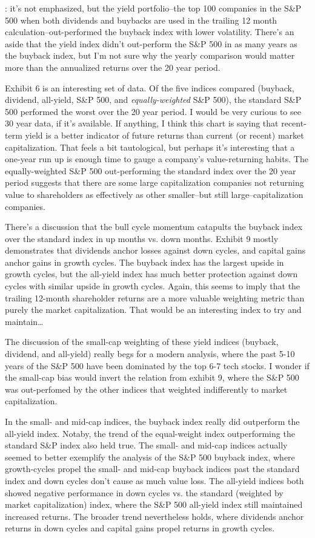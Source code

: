 \documentclass{article}
\begin{document}
: it's not emphasized, but the yield portfolio--the top 100 companies in the S\&P 500 when both dividends and buybacks are used in the trailing 12 month calculation--out-performed the buyback index with lower volatility.  There's an aside that the yield index didn't out-perform the S\&P 500 in as many years as the buyback index, but I'm not sure why the yearly comparison would matter more than the annualized returns over the 20 year period.

Exhibit 6 is an interesting set of data.  Of the five indices compared (buyback, dividend, all-yield, S\&P 500, and {\it equally-weighted} S\&P 500), the standard S\&P 500 performed the worst over the 20 year period.  I would be very curious to see 30 year data, if it's available.  If anything, I think this chart is saying that recent-term yield is a better indicator of future returns than current (or recent) market capitalization.  That feels a bit tautological, but perhaps it's interesting that a one-year run up is enough time to gauge a company's value-returning habits.  The equally-weighted S\&P 500 out-performing the standard index over the 20 year period suggests that there are some large capitalization companies not returning value to shareholders as effectively as other smaller--but still large--capitalization companies.

There's a discussion that the bull cycle momentum catapults the buyback index over the standard index in up months vs. down months.  Exhibit 9 mostly demonstrates that dividends anchor losses against down cycles, and capital gains anchor gains in growth cycles.  The buyback index has the largest upside in growth cycles, but the all-yield index has much better protection against down cycles with similar upside in growth cycles.  Again, this seems to imply that the trailing 12-month shareholder returns are a more valuable weighting metric than purely the market capitalization.  That would be an interesting index to try and maintain\ldots

The discussion of the small-cap weighting of these yield indices (buyback, dividend, and all-yield) really begs for a modern analysis, where the past 5-10 years of the S\&P 500 have been dominated by the top 6-7 tech stocks.  I wonder if the small-cap bias would invert the relation from exhibit 9, where the S\&P 500 was out-perfomed by the other indices that weighted indifferently to market capitalization.

In the small- and mid-cap indices, the buyback index really did outperform the all-yield index.  Notaby, the trend of the equal-weight index outperforming the standard S\&P index also held true.  The small- and mid-cap indices actually seemed to better exemplify the analysis of the S\&P 500 buyback index, where growth-cycles propel the small- and mid-cap buyback indices past the standard index and down cycles don't cause as much value loss.  The all-yield indices both showed negative performance in down cycles vs. the standard (weighted by market capitalization) index, where the S\&P 500 all-yield index still maintained increased returns.  The broader trend nevertheless holds, where dividends anchor returns in down cycles and capital gains propel returns in growth cycles.
\end{document}

